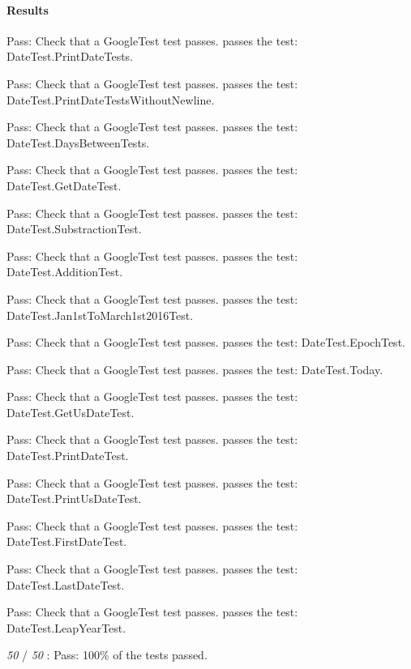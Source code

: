 \paragraph*{Results}


\begin{DoxyItemize}
\item Pass\+: Check that a Google\+Test test passes. passes the test\+: Date\+Test.\+Print\+Date\+Tests.
\item Pass\+: Check that a Google\+Test test passes. passes the test\+: Date\+Test.\+Print\+Date\+Tests\+Without\+Newline.
\item Pass\+: Check that a Google\+Test test passes. passes the test\+: Date\+Test.\+Days\+Between\+Tests.
\item Pass\+: Check that a Google\+Test test passes. passes the test\+: Date\+Test.\+Get\+Date\+Test.
\item Pass\+: Check that a Google\+Test test passes. passes the test\+: Date\+Test.\+Substraction\+Test.
\item Pass\+: Check that a Google\+Test test passes. passes the test\+: Date\+Test.\+Addition\+Test.
\item Pass\+: Check that a Google\+Test test passes. passes the test\+: Date\+Test.\+Jan1st\+To\+March1st2016\+Test.
\item Pass\+: Check that a Google\+Test test passes. passes the test\+: Date\+Test.\+Epoch\+Test.
\item Pass\+: Check that a Google\+Test test passes. passes the test\+: Date\+Test.\+Today.
\item Pass\+: Check that a Google\+Test test passes. passes the test\+: Date\+Test.\+Get\+Us\+Date\+Test.
\item Pass\+: Check that a Google\+Test test passes. passes the test\+: Date\+Test.\+Print\+Date\+Test.
\item Pass\+: Check that a Google\+Test test passes. passes the test\+: Date\+Test.\+Print\+Us\+Date\+Test.
\item Pass\+: Check that a Google\+Test test passes. passes the test\+: Date\+Test.\+First\+Date\+Test.
\item Pass\+: Check that a Google\+Test test passes. passes the test\+: Date\+Test.\+Last\+Date\+Test.
\item Pass\+: Check that a Google\+Test test passes. passes the test\+: Date\+Test.\+Leap\+Year\+Test.
\item {\itshape 50} / {\itshape 50} \+: Pass\+: 100\% of the tests passed.
\end{DoxyItemize}

